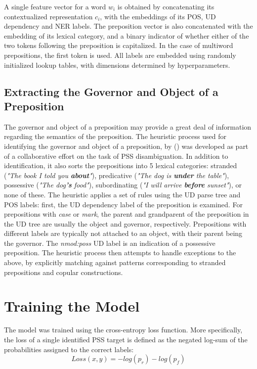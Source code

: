 A single feature vector for a word $w_i$ is obtained by concatenating its contextualized representation $c_i$, with the embeddings of its POS, UD dependency and NER labels. The preposition vector is also concatenated with the embedding of its lexical category, and a binary indicator of whether either of the two tokens following the preposition is capitalized. In the case of multiword prepositions, the first token is used. All labels are embedded using randomly initialized lookup tables, with dimensions determined by hyperparameters.

\subsection{Extracting the Governor and Object of a Preposition} \label{sec:govobj}

The governor and object of a preposition may provide a great deal of information regarding the semantics of the preposition. The heuristic process used for identifying the governor and object of a preposition, by (\cite{snacs}) was developed as part of a collaborative effort on the task of PSS disambiguation. In addition to identification, it also sorts the prepositions into 5 lexical categories: stranded (\emph{"The book I told you \textbf{about}"}), predicative (\emph{"The dog is \textbf{under} the table"}), possessive (\emph{"The dog\textbf{'s} food"}), subordinating (\emph{"I will arrive \textbf{before} sunset"}), or none of these. The heuristic applies a set of rules using the UD parse tree and POS labels: first, the UD dependency label of the preposition is examined. For prepositions with \emph{case} or \emph{mark}, the parent and grandparent of the preposition in the UD tree are usually the object and governor, respectively. Prepositions with different labels are typically not attached to an object, with their parent being the governor.  The \emph{nmod:poss} UD label is an indication of a possessive preposition. The heuristic process then attempts to handle exceptions to the above, by explicitly matching against patterns corresponding to stranded prepositions and copular constructions.  
\section{Training the Model} \label{sec:psstraining}

The model was trained using the cross-entropy loss function. More specifically, the loss of a single identified PSS target is defined as the negated log-sum of the probabilities assigned to the correct labels: 
$$ Loss(x, y) = - log(p_r) - log(p_f) $$

